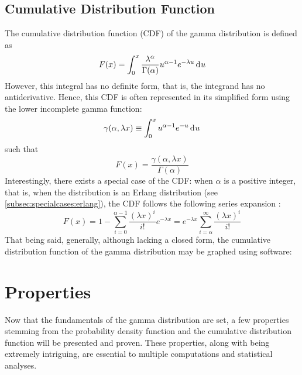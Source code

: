 \documentclass[12pt]{article}
\begin{document}
\subsection{Cumulative Distribution Function}\label{subsec:gamma:cdf} The cumulative distribution
function (CDF) of the gamma distribution is defined as
\begin{equation}
	F(x) = \int^x_0\frac{\lambda^\alpha}{\Gamma(\alpha)}u^{\alpha-1}e^{-\lambda u}\mathop{}\!\mathrm{d^{}}u
\end{equation}
However, this integral has no definite form, that is, the integrand has no antiderivative. Hence, this CDF is often
represented in its simplified form using the lower incomplete gamma function\cite{weissteinIncompleteGammaFunction}:
\begin{equation}
	\gamma(\alpha, \lambda x)\equiv\int^x_0u^{\alpha-1}e^{-u}\mathop{}\!\mathrm{d^{}}u
\end{equation}
such that
\begin{equation}
	F(x) = \frac{\gamma(\alpha, \lambda x)}{\Gamma(\alpha)}
\end{equation}
Interestingly, there exists a special case of the CDF: when $\alpha$ is a positive integer, that is, when the distribution
is an Erlang distribution (see \autoref{subsec:specialcases:erlang}), the CDF follows the following series expansion
\cite{wikipediaGammaDistribution2022}:
\begin{equation}
	F(x) = 1-\sum^{\alpha-1}_{i=0}\frac{(\lambda x)^i}{i!}e^{-\lambda x} = e^{-\lambda x}\sum^\infty_{i=\alpha}\frac{(\lambda x)^i}{i!}
\end{equation}
That being said, generally, although lacking a closed form, the cumulative distribution function of the gamma
distribution may be graphed using software:


\pagebreak
\section{Properties}
Now that the fundamentals of the gamma distribution are set, a few properties stemming from the probability density
function and the cumulative distribution function will be presented and proven. These properties, along
with being extremely intriguing, are essential to multiple computations and statistical analyses.
\end{document}
